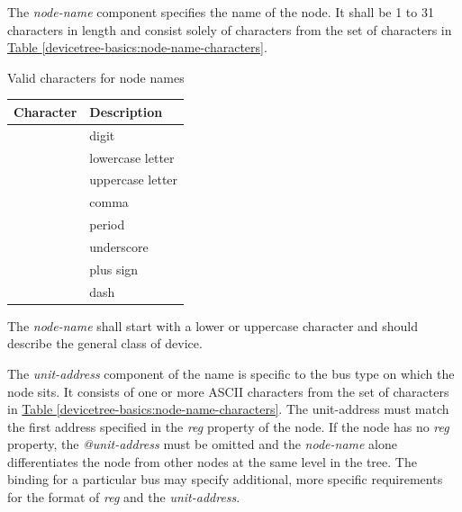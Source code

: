\documentclass[a4paper,10pt,oneside]{sphinxmanual}
\begin{document}
The \emph{node-name} component specifies the name of the node. It shall be 1
to 31 characters in length and consist solely of characters from the set
of characters in \hyperref[devicetree-basics:node-name-characters]{Table \ref{devicetree-basics:node-name-characters}}.


\begin{threeparttable}
\capstart\caption{Valid characters for node names}\label{devicetree-basics:node-name-characters}\label{devicetree-basics:id4}
\begin{tabulary}{\linewidth}{| c p{8cm} |}
\hline
\textsf{\relax 
Character
} & \textsf{\relax 
Description
}\\
\hline
{}
 & 
digit
\\
\hline
{}
 & 
lowercase letter
\\
\hline
{}
 & 
uppercase letter
\\
\hline
\code{,}
 & 
comma
\\
\hline
{}
 & 
period
\\
\hline
\code{\_}
 & 
underscore
\\
\hline
\code{+}
 & 
plus sign
\\
\hline
\code{-}
 & 
dash
\\
\hline\end{tabulary}

\end{threeparttable}


The \emph{node-name} shall start with a lower or uppercase character and
should describe the general class of device.

The \emph{unit-address} component of the name is specific to the bus type on
which the node sits. It consists of one or more ASCII characters from
the set of characters in \hyperref[devicetree-basics:node-name-characters]{Table \ref{devicetree-basics:node-name-characters}}. The
unit-address must match the first
address specified in the \emph{reg} property of the node. If the node has no
\emph{reg} property, the \emph{@unit-address} must be omitted and the
\emph{node-name} alone differentiates the node from other nodes at the same
level in the tree. The binding for a particular bus may specify
additional, more specific requirements for the format of \emph{reg} and the
\emph{unit-address}.
\end{document}
